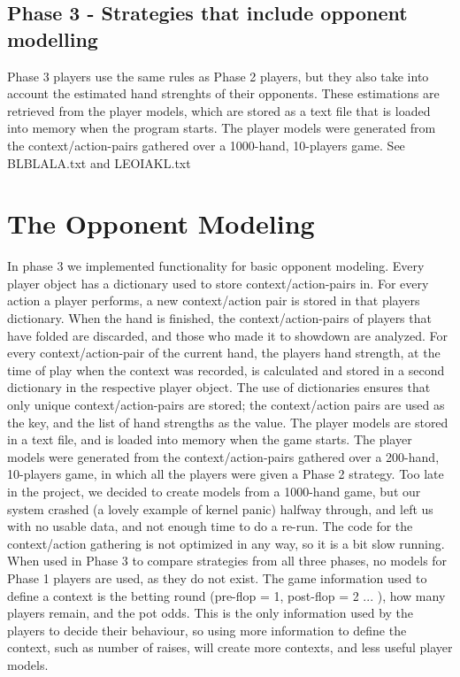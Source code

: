 \documentclass[titlepage]{article}
\begin{document}
	\subsection{Phase 3 - Strategies that include opponent modelling}
		Phase 3 players use the same rules as Phase 2 players, but they also take into account the estimated hand strenghts of their opponents. These estimations are retrieved from the player models, which are stored as a text file that is loaded into memory when the program starts. The player models were generated from the context/action-pairs gathered over a 1000-hand, 10-players game. See BLBLALA.txt and LEOIAKL.txt
		
\section{The Opponent Modeling}
    In phase 3 we implemented functionality for basic opponent modeling. Every player object has a dictionary used to store context/action-pairs in. For every action a player performs, a new context/action pair is stored in that players dictionary. When the hand is finished, the context/action-pairs of players that have folded are discarded, and those who made it to showdown are analyzed. For every context/action-pair of the current hand, the players hand strength, at the time of play when the context was recorded, is calculated and stored in a second dictionary in the respective player object. The use of dictionaries ensures that only unique context/action-pairs are stored; the context/action pairs are used as the key, and the list of hand strengths as the value. The player models are stored in a text file, and is loaded into memory when the game starts. The player models were generated from the context/action-pairs gathered over a 200-hand, 10-players game, in which all the players were given a Phase 2 strategy. Too late in the project, we decided to create models from a 1000-hand game, but our system crashed (a lovely example of kernel panic) halfway through, and left us with no usable data, and not enough time to do a re-run. The code for the context/action gathering is not optimized in any way, so it is a bit slow running. When used in Phase 3 to compare strategies from all three phases, no models for Phase 1 players are used, as they do not exist. The game information used to define a context is the betting round (pre-flop = 1, post-flop = 2 ... ), how many players remain, and the pot odds. This is the only information used by the players to decide their behaviour, so using more information to define the context, such as number of raises, will create more contexts, and less useful player models. 
		
\end{document}
